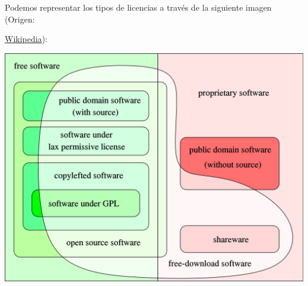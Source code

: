 Podemos representar los tipos de licencias a través de la siguiente imagen (Origen: {\href{https://en.wikipedia.org/wiki/Free_software\#Definition_and_the_Four_Essential_Freedoms_of_Free_Software}{Wikipedia}):

\begin{center}
    \vspace{-10pt}
    \includegraphics[width=0.65\linewidth]{free_and_nonfree_software.png}
\end{center}


\let\foo\section %
\let\section\subsection
\let\subsection\subsubsection
\graphicspath{{../../../temas_comunes/gnu_linux/img}}


}
